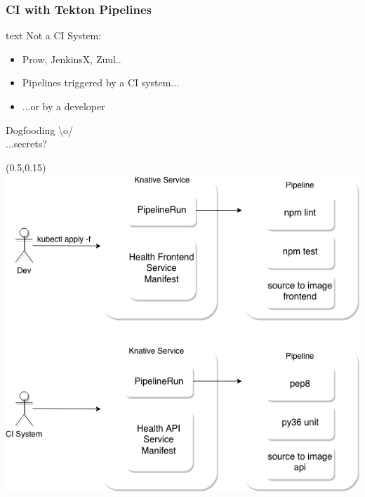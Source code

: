 \documentclass[aspectratio=169,11pt,hyperref={colorlinks=true}]{beamer}
\begin{document}
\begin{lblackrwhiteframe}
\begin{blackframe}
\begin{lblackrwhiteframe}
  \frametitle{CI with Tekton Pipelines}
  \large
  \begin{beamercolorbox}[wd=0.45\paperwidth]{text}
    \vspace{3ex}
    Not a CI System: \\
    \begin{itemize}
      \item Prow, JenkinsX, Zuul..
      \item Pipelines triggered by a CI system...
      \item ...or by a developer
    \end{itemize}
    \vspace{3ex}
    Dogfooding \textbackslash o/ \\
    \vspace{3ex}
    ...secrets? \\
  \end{beamercolorbox}%
  \begin{textblock*}{0.5\paperwidth}(0.5\paperwidth,0.15\paperheight)
    \centering
    \includegraphics[width=0.45\paperwidth]{img/tekton_ci.png}
  \end{textblock*}
\end{lblackrwhiteframe}


\end{blackframe}
\end{lblackrwhiteframe}
\end{document}
